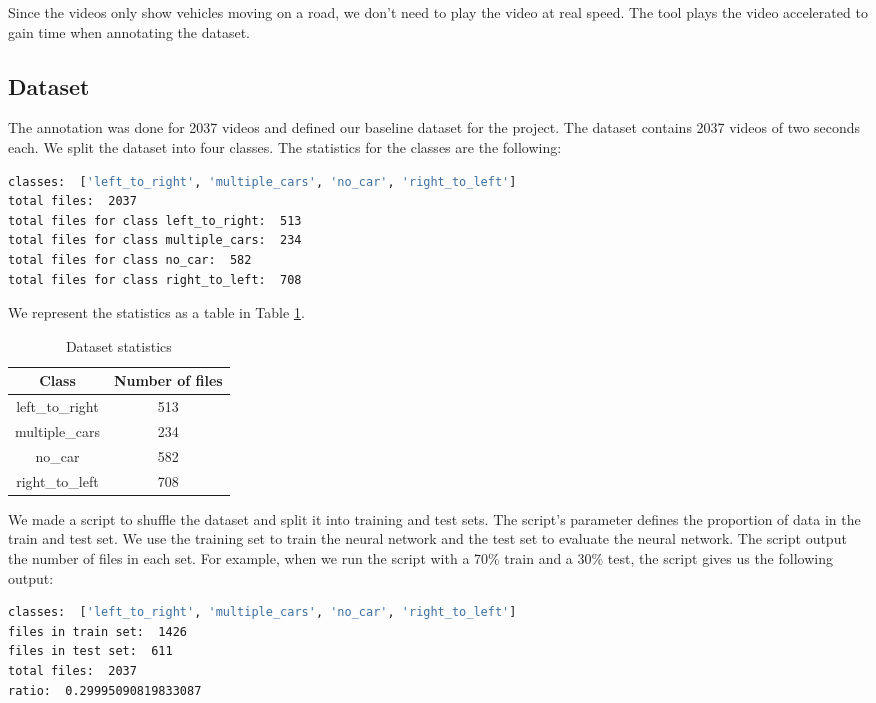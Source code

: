 Since the videos only show vehicles moving on a road, we don't need to play the video at real speed. The tool plays the video accelerated to gain time when annotating the dataset. 

\subsection{Dataset}

The annotation was done for 2037 videos and defined our baseline dataset for the project. The dataset contains 2037 videos of two seconds each. We split the dataset into four classes. The statistics for the classes are the following:

\begin{lstlisting}[language=bash]
classes:  ['left_to_right', 'multiple_cars', 'no_car', 'right_to_left']
total files:  2037
total files for class left_to_right:  513
total files for class multiple_cars:  234
total files for class no_car:  582
total files for class right_to_left:  708
\end{lstlisting}

We represent the statistics as a table in Table \ref{tab:dataset_statistics}.

\begin{table}[H]
    \centering
    \begin{tabular}{|c|c|}
        \hline
        \textbf{Class} & \textbf{Number of files} \\
        \hline
        left\_to\_right & 513 \\
        \hline
        multiple\_cars & 234 \\
        \hline
        no\_car & 582 \\
        \hline
        right\_to\_left & 708 \\
        \hline
    \end{tabular}
    \caption{Dataset statistics}
    \label{tab:dataset_statistics}
\end{table}

We made a script to shuffle the dataset and split it into training and test sets. The script's parameter defines the proportion of data in the train and test set. We use the training set to train the neural network and the test set to evaluate the neural network. The script output the number of files in each set. For example, when we run the script with a 70\% train and a 30\% test, the script gives us the following output:

\begin{lstlisting}[language=bash]
classes:  ['left_to_right', 'multiple_cars', 'no_car', 'right_to_left']
files in train set:  1426
files in test set:  611
total files:  2037
ratio:  0.29995090819833087
\end{lstlisting}

